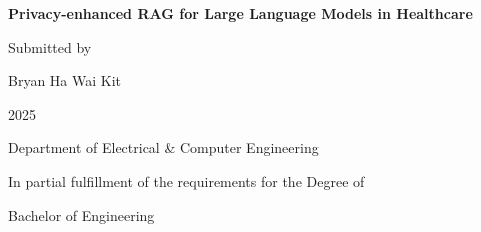 \begin{titlepage}
	\centering

	\vspace*{4cm} %

	\Large \textbf{Privacy-enhanced RAG for Large Language Models in Healthcare} %

	\vspace*{3cm} %

	\Large Submitted by

	\vspace*{0.5cm}

	\Large {Bryan Ha Wai Kit} %

	\vspace*{0.5cm}

	\Large 2025 %

	\vspace*{3.5cm} %

	\Large Department of Electrical \& Computer Engineering

	\vspace*{4cm} %

	\Large In partial fulfillment of the requirements for the Degree of

	\vspace*{0.5cm}

	\Large Bachelor of Engineering
\end{titlepage}
